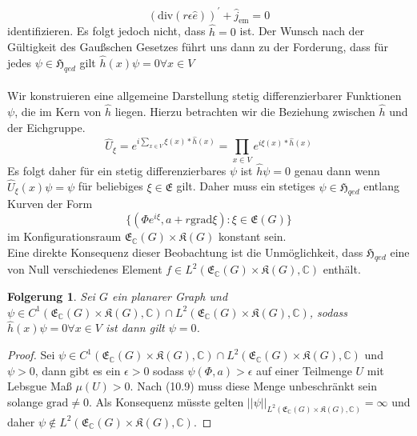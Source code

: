 \documentclass[11pt,a4paper,leqno]{report}
\newtheorem{corollary}[theorem]{Folgerung}
\numberwithin{equation}{chapter}
\begin{document}
\begin{equation}
(\text{div}(r\epsilon \hat{e}))^\prime + \hat{j}_{\text{em}}=0
\end{equation} identifizieren.  Es folgt jedoch nicht, dass $\hat{h}=0$ ist. Der Wunsch nach der G\"ultigkeit des Gau\ss{}schen Gesetzes f\"uhrt uns dann zu der Forderung, dass f\"ur jedes $\psi\in\mathfrak{H}_{qed}$ gilt $\hat{h}(x)\psi = 0\forall x\in V$\\
\\
Wir konstruieren eine allgemeine Darstellung stetig differenzierbarer Funktionen $\psi$, die im Kern von $\hat{h}$ liegen. Hierzu betrachten wir die Beziehung zwischen $\hat{h}$ und der Eichgruppe.
\begin{equation}
	\hat{U}_\xi = e^{i\sum_{x\in V}\xi(x)*\hat{h}(x)} = \prod_{x\in V}e^{i\xi(x)*\hat{h}(x)}
\end{equation}
Es folgt daher f\"ur ein stetig differenzierbares $\psi$ ist $\hat{h}\psi=0$ genau dann wenn $\hat{U}_\xi(x)\psi = \psi$ f\"ur beliebiges $\xi\in\mathfrak{E}$ gilt. Daher muss ein stetiges $\psi\in \mathfrak{H}_{qed}$ entlang Kurven der Form
\begin{equation}
	\{(\Phi e^{i\xi}, a + r \text{grad}\xi): \xi\in\mathfrak{E}(G)\}
\end{equation} 
im Konfigurationsraum $\mathfrak{E}_\mathbb{C}(G)\times\mathfrak{K}(G)$ konstant sein.\\
Eine direkte Konsequenz dieser Beobachtung ist die Unm\"oglichkeit, dass $\mathfrak{H}_{qed}$ eine von Null verschiedenes Element $f\in L^2(\mathfrak{E}_\mathbb{C}(G)\times\mathfrak{K}(G), \mathbb{C})$ enth\"alt.
\begin{corollary}
	Sei $G$ ein planarer Graph und $\psi\in C^1(\mathfrak{E}_\mathbb{C}(G)\times\mathfrak{K}(G), \mathbb{C})\cap L^2(\mathfrak{E}_\mathbb{C}(G)\times\mathfrak{K}(G), \mathbb{C})$, sodass $\hat{h}(x)\psi=0\forall x\in V$ ist dann gilt $\psi = 0$.
\end{corollary}
\begin{proof}
	Sei $\psi\in C^1(\mathfrak{E}_\mathbb{C}(G)\times\mathfrak{K}(G), \mathbb{C})\cap L^2(\mathfrak{E}_\mathbb{C}(G)\times\mathfrak{K}(G), \mathbb{C})$ und $\psi>0$, dann gibt es ein $\epsilon>0$ sodass $\psi(\Phi, a)>\epsilon$ auf einer Teilmenge $U$ mit Lebsgue Ma\ss{} $\mu(U)>0$. Nach (10.9) muss diese Menge unbeschr\"ankt sein solange $\text{grad}\neq 0$. Als Konsequenz m\"usste gelten $||\psi||_{L^2(\mathfrak{E}_\mathbb{C}(G)\times\mathfrak{K}(G), \mathbb{C})}=\infty$ und daher $\psi \notin L^2(\mathfrak{E}_\mathbb{C}(G)\times\mathfrak{K}(G), \mathbb{C})$.
\end{proof}
\end{document}
